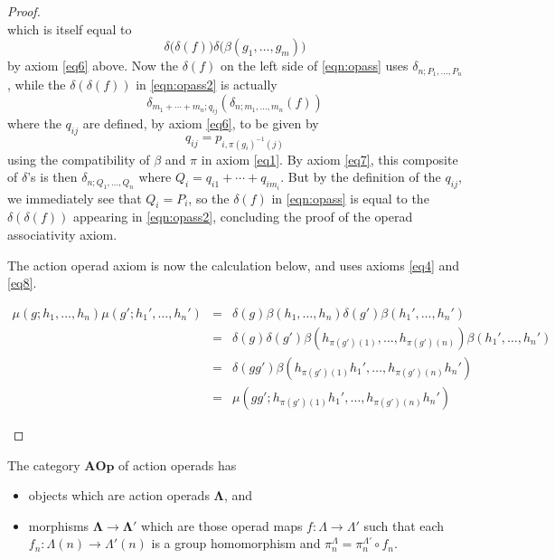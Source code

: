 \documentclass{amsbook} %
\newcommand{\mb}{\mathbf}
\newenvironment{eqn}{\begin{equation}}{\end{equation}}
\numberwithin{section}{chapter}
\begin{document}
\begin{proof}
\[\]
which is itself equal to
\begin{eqn}\label{eqn:opass2}
\delta\big(\delta(f)\big) \delta\big(\beta(g_{1}, \ldots, g_{m})\big)
\end{eqn}by axiom \eqref{eq6} above.  Now the $\delta(f)$ on the left side of \cref{eqn:opass} uses $\delta_{n; P_{1}, \ldots, P_{n}}$, while the $\delta(\delta(f))$ in \cref{eqn:opass2} is actually
\[
\delta_{m_1 + \cdots + m_{n}; q_{ij}}(\delta_{n; m_{1}, \ldots, m_{n}} (f))
\]
where the $q_{ij}$ are defined, by axiom \eqref{eq6}, to be given by
\[
q_{ij} = p_{i,\pi(g_{i})^{-1}(j)}
\]
using the compatibility of $\beta$ and $\pi$ in axiom \eqref{eq1}.  By axiom \eqref{eq7}, this composite of $\delta$'s  is then $\delta_{n; Q_{1}, \ldots, Q_{n}}$ where $Q_{i} = q_{i1} + \cdots + q_{im_{i}}$.  But by the definition of the $q_{ij}$, we immediately see that $Q_{i} = P_{i}$, so the $\delta(f)$ in \cref{eqn:opass} is equal to the $\delta(\delta(f))$ appearing in \cref{eqn:opass2}, concluding the proof of the operad associativity axiom.

The action operad axiom is now the calculation below, and uses axioms \eqref{eq4} and \eqref{eq8}.
\begin{small}
\[
\begin{array}{rcl}
\mu(g; h_{1}, \ldots, h_{n})\mu(g'; h_{1}', \ldots, h_{n}') & = & \delta(g) \beta(h_{1}, \ldots, h_{n}) \delta(g') \beta(h_{1}', \ldots, h_{n}') \\
& = & \delta(g) \delta(g') \beta(h_{\pi(g')(1)}, \ldots, h_{\pi(g')(n)})  \beta(h_{1}', \ldots, h_{n}') \\
& = & \delta(gg') \beta(h_{\pi(g')(1)}h_{1}', \ldots, h_{\pi(g')(n)}h_{n}') \\
& = & \mu(gg'; h_{\pi(g')(1)}h_{1}', \ldots, h_{\pi(g')(n)}h_{n}')
\end{array}
\]
\end{small}
\end{proof}

\begin{Defi}\label{Defi:cat_aop}
The category $\mb{AOp}$ of action operads has
\begin{itemize}
\item objects which are action operads $\mb{\Lambda}$, and
\item morphisms $\mb{\Lambda} \rightarrow \mb{\Lambda'}$ which are those operad maps $f:\Lambda \rightarrow \Lambda'$ such that each $f_{n}:\Lambda(n) \rightarrow \Lambda'(n)$ is a group homomorphism and $\pi_{n}^{\Lambda} = \pi_{n}^{\Lambda'} \circ f_{n}$.
\end{itemize}
\end{Defi}
\end{document}
